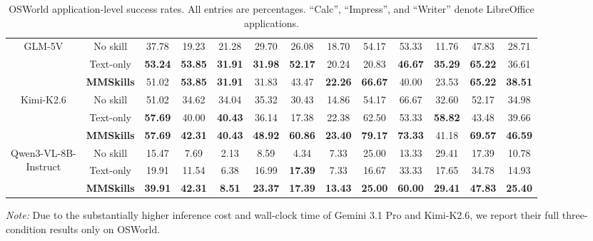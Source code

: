 \documentclass{llmxive}
\providecommand{\mmskillhl}{\cellcolor{mmskillrow}}
\begin{document}
\begin{table}[!t]
{\begin{tabular}{ccccccccccccc}
\multirow{3}{*}{\parbox{1.9cm}{\centering GLM-5V}}
 & No skill & 37.78 & 19.23 & 21.28 & 29.70 & 26.08 & 18.70 & 54.17 & 53.33 & 11.76 & 47.83 & 28.71 \\
 & Text-only & \textbf{53.24} & \textbf{53.85} & \textbf{31.91} & \textbf{31.98} & \textbf{52.17} & 20.24 & 20.83 & \textbf{46.67} & \textbf{35.29} & \textbf{65.22} & 36.61 \\
 & \mmskillhl \textbf{MMSkills} & \mmskillhl 51.02 & \mmskillhl \textbf{53.85} & \mmskillhl \textbf{31.91} & \mmskillhl 31.83 & \mmskillhl 43.47 & \mmskillhl \textbf{22.26} & \mmskillhl \textbf{66.67} & \mmskillhl 40.00 & \mmskillhl 23.53 & \mmskillhl \textbf{65.22} & \mmskillhl \textbf{38.51} \\
\midrule
\multirow{3}{*}{\parbox{1.9cm}{\centering Kimi-K2.6}}
 & No skill & 51.02 & 34.62 & 34.04 & 35.32 & 30.43 & 14.86 & 54.17 & 66.67 & 32.60 & 52.17 & 34.98 \\
 & Text-only & \textbf{57.69} & 40.00 & \textbf{40.43} & 36.14 & 17.38 & 22.38 & 62.50 & 53.33 & \textbf{58.82} & 43.48 & 39.66 \\
 & \mmskillhl \textbf{MMSkills} & \mmskillhl \textbf{57.69} & \mmskillhl \textbf{42.31} & \mmskillhl \textbf{40.43} & \mmskillhl \textbf{48.92} & \mmskillhl \textbf{60.86} & \mmskillhl \textbf{23.40} & \mmskillhl \textbf{79.17} & \mmskillhl \textbf{73.33} & \mmskillhl 41.18 & \mmskillhl \textbf{69.57} & \mmskillhl \textbf{46.59} \\
\midrule
\multirow{3}{*}{\parbox{1.9cm}{\centering Qwen3-VL-8B-\\Instruct}}
 & No skill & 15.47 & 7.69 & 2.13 & 8.59 & 4.34 & 7.33 & 25.00 & 13.33 & 29.41 & 17.39 & 10.78 \\
 & Text-only & 19.91 & 11.54 & 6.38 & 16.99 & \textbf{17.39} & 7.33 & 16.67 & 33.33 & 17.65 & 34.78 & 14.93 \\
 & \mmskillhl \textbf{MMSkills} & \mmskillhl \textbf{39.91} & \mmskillhl \textbf{42.31} & \mmskillhl \textbf{8.51} & \mmskillhl \textbf{23.37} & \mmskillhl \textbf{17.39} & \mmskillhl \textbf{13.43} & \mmskillhl \textbf{25.00} & \mmskillhl \textbf{60.00} & \mmskillhl \textbf{29.41} & \mmskillhl \textbf{47.83} & \mmskillhl \textbf{25.40} \\
\bottomrule
\end{tabular}}
\vspace{-0.15em}
\parbox{\textwidth}{\scriptsize\emph{Note:} Due to the substantially higher inference cost and wall-clock time of Gemini 3.1 Pro and Kimi-K2.6, we report their full three-condition results only on OSWorld.}
\caption{OSWorld application-level success rates. All entries are percentages. ``Calc'', ``Impress'', and ``Writer'' denote LibreOffice applications.}
\label{tab:osworld-domain-results}
\end{table}
\end{document}

